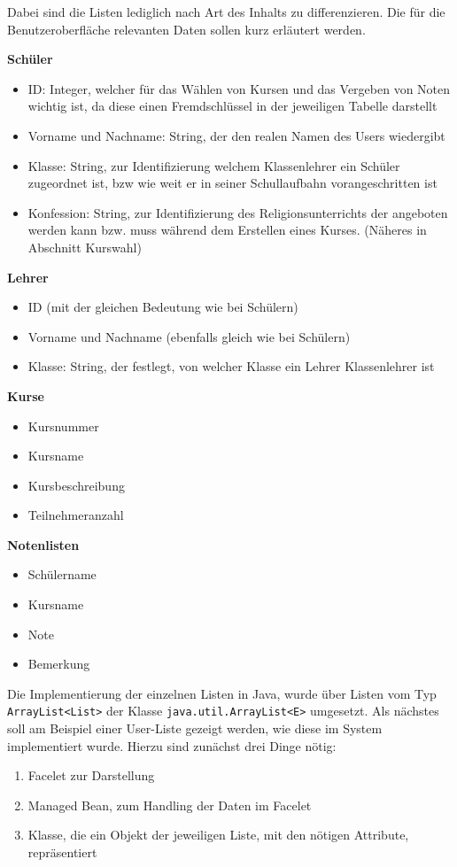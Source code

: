 Dabei sind die Listen lediglich nach Art des Inhalts zu differenzieren. 
Die für die Benutzeroberfläche relevanten Daten sollen kurz erläutert werden. 

\textbf{Schüler}
\begin{itemize}
  \item ID: Integer, welcher für das Wählen von Kursen und das Vergeben von Noten wichtig ist, da diese einen Fremdschlüssel in der jeweiligen Tabelle darstellt
  \item Vorname und Nachname: String, der den realen Namen des Users wiedergibt
  \item Klasse: String, zur Identifizierung welchem Klassenlehrer ein Schüler zugeordnet ist, bzw wie weit er in seiner Schullaufbahn vorangeschritten ist
  \item Konfession: String, zur Identifizierung des Religionsunterrichts der angeboten werden kann bzw. muss während dem Erstellen eines Kurses. (Näheres in Abschnitt Kurswahl)
\end{itemize}

\textbf{Lehrer}
\begin{itemize}
  \item ID (mit der gleichen Bedeutung wie bei Schülern)
  \item Vorname und Nachname (ebenfalls gleich wie bei Schülern)
  \item Klasse: String, der festlegt, von welcher Klasse ein Lehrer Klassenlehrer ist
\end{itemize}

\textbf{Kurse}
\begin{itemize}
  \item Kursnummer
  \item Kursname
  \item Kursbeschreibung
  \item Teilnehmeranzahl
\end{itemize}

\textbf{Notenlisten}
\begin{itemize}
  \item Schülername
  \item Kursname
  \item Note
  \item Bemerkung
\end{itemize}

Die Implementierung der einzelnen Listen in Java, wurde über Listen vom Typ \texttt{ArrayList<List>} der Klasse \texttt{java.util.ArrayList<E>} umgesetzt. 
Als nächstes soll am Beispiel einer User-Liste gezeigt werden, wie diese im System implementiert wurde.
Hierzu sind zunächst drei Dinge nötig:
\begin{enumerate}
  \item Facelet zur Darstellung
  \item Managed Bean, zum Handling der Daten im Facelet
  \item Klasse, die ein Objekt der jeweiligen Liste, mit den nötigen Attribute, repräsentiert
\end{enumerate}

